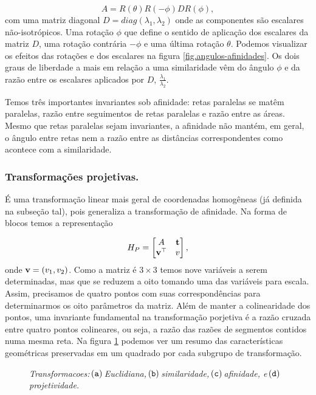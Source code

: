 \begin{equation*}
A=R(\theta)R(-\phi)DR(\phi),
\end{equation*}
com uma matriz diagonal $D=diag(\lambda_1, \lambda_2)$ onde as componentes são escalares não-isotrópicos. Uma rotação $\phi$ que define o sentido de aplicação dos escalares da matriz $D$, uma rotação contrária $-\phi$ e uma última rotação $\theta$. Podemos visualizar os efeitos das rotações e dos escalares na figura \ref{fig.angulos-afinidades}. Os dois graus de liberdade a mais em relação a uma similaridade vêm do ângulo $\phi$ e da razão entre os escalares aplicados por $D$, $\frac{\lambda_1}{\lambda_2}$. 


Temos três importantes invariantes sob afinidade: retas paralelas se matêm paralelas, razão entre seguimentos de retas paralelas e razão entre as áreas. Mesmo que retas paralelas sejam invariantes, a afinidade não mantém, em geral, o ângulo entre retas nem a razão entre as distâncias correspondentes como acontece com a similaridade.

\subsubsection*{Transformações projetivas.}
É uma transformação linear mais geral de coordenadas homogêneas (já definida na subseção tal), pois generaliza  a transformação de afinidade. Na forma de blocos temos a representação

\begin{equation*}
H_P=
\begin{bmatrix}
A&{\bf t}\\
{\bf v}^\top&v
\end{bmatrix},
\end{equation*}
onde ${\bf v}=(v_1,v_2)$. Como a matriz é $3\times3$ temos nove variáveis a serem determinadas, mas que se reduzem a oito tomando uma das variáveis para escala. Assim, precisamos de quatro pontos com suas correspondências para determinarmos os oito parâmetros da matriz. Além de manter a colinearidade dos pontos, uma invariante fundamental na transformação porjetiva é a razão cruzada entre quatro pontos colineares, ou seja, a razão das razões de segmentos contidos numa mesma reta. Na figura \ref{fig.transformacoes-2D} podemos ver um resumo das características geométricas preservadas em um quadrado por cada subgrupo de transformação.   

\begin{figure}[!htb]
\centering
{}
\qquad
{}
\qquad
{}
\qquad
{}
\quad
\caption{\textit{Transformacoes:}$\,({\tt a})\,$\textit{Euclidiana,}$\,({\tt b})\,$\textit{similaridade,}$\,({\tt c})\,${\it afinidade, e}$\,({\tt d})\,${\it projetividade.}}
\label{fig.transformacoes-2D}
\end{figure}






